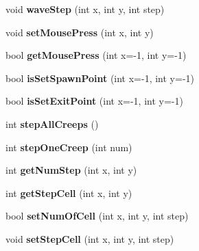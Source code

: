 \begin{DoxyCompactItemize}
\item 
\hypertarget{class_field_a2825a62bfc71d68759c81853001d361b}{}void {\bfseries wave\+Step} (int x, int y, int step)\label{class_field_a2825a62bfc71d68759c81853001d361b}

\item 
\hypertarget{class_field_a45835749b269e71ad4d24f875fe25aab}{}void {\bfseries set\+Mouse\+Press} (int x, int y)\label{class_field_a45835749b269e71ad4d24f875fe25aab}

\item 
\hypertarget{class_field_a6f19d20caa869b0fe4f1ff66c56f263f}{}bool {\bfseries get\+Mouse\+Press} (int x=-\/1, int y=-\/1)\label{class_field_a6f19d20caa869b0fe4f1ff66c56f263f}

\item 
\hypertarget{class_field_a1d68b50953aab10fe2210681d56c90b8}{}bool {\bfseries is\+Set\+Spawn\+Point} (int x=-\/1, int y=-\/1)\label{class_field_a1d68b50953aab10fe2210681d56c90b8}

\item 
\hypertarget{class_field_ace5e3e9c460a4d9a4dee6bf1f64886bf}{}bool {\bfseries is\+Set\+Exit\+Point} (int x=-\/1, int y=-\/1)\label{class_field_ace5e3e9c460a4d9a4dee6bf1f64886bf}

\item 
\hypertarget{class_field_a7f8d57126948115ce8704ab08ce124b3}{}int {\bfseries step\+All\+Creeps} ()\label{class_field_a7f8d57126948115ce8704ab08ce124b3}

\item 
\hypertarget{class_field_a33684155a7ee88edc89ef19dcf15bfb7}{}int {\bfseries step\+One\+Creep} (int num)\label{class_field_a33684155a7ee88edc89ef19dcf15bfb7}

\item 
\hypertarget{class_field_a32c137840066a8473dda74cc42b478e9}{}int {\bfseries get\+Num\+Step} (int x, int y)\label{class_field_a32c137840066a8473dda74cc42b478e9}

\item 
\hypertarget{class_field_af11a397ca62bd6a450588a0555d50a29}{}int {\bfseries get\+Step\+Cell} (int x, int y)\label{class_field_af11a397ca62bd6a450588a0555d50a29}

\item 
\hypertarget{class_field_ae6b7cc9533b06e76fdeef8039d2966ed}{}bool {\bfseries set\+Num\+Of\+Cell} (int x, int y, int step)\label{class_field_ae6b7cc9533b06e76fdeef8039d2966ed}

\item 
\hypertarget{class_field_a2bb27ba80bd13c8855262705f9389c92}{}void {\bfseries set\+Step\+Cell} (int x, int y, int step)\label{class_field_a2bb27ba80bd13c8855262705f9389c92}


\end{DoxyCompactItemize}
